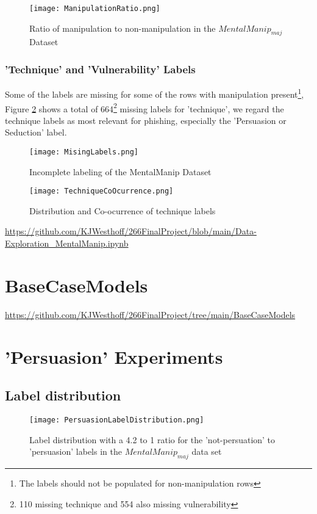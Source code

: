\documentclass[
	letterpaper, %
	12pt, %
	unnumberedsections, %
	twoside, %
]{LTJournalArticle}
\begin{document}
\begin{appendices}
	\begin{figure}[!htp] %
		\centering
		\texttt{[image: ManipulationRatio.png]}
		\caption{Ratio of manipulation to non-manipulation in the $MentalManip_{maj}$ Dataset}
		\label{fig:ManipulationRatio}
	\end{figure}

	\subsubsection{'Technique' and 'Vulnerability' Labels}
	Some of the labels are missing for some of the rows with manipulation present\footnote{The labels should not be populated for non-manipulation rows}, Figure \ref{fig:MissingLabels} shows a total of 664\footnote{110 missing technique and 554 also missing vulnerability} missing labels for 'technique', we regard the technique labels as most relevant for phishing, especially the 'Persuasion or Seduction' label.
	\begin{figure}[!htp] %
		\centering
		\texttt{[image: MisingLabels.png]}
		\caption{Incomplete labeling of the MentalManip Dataset}
		\label{fig:MissingLabels}
	\end{figure}


	\begin{figure}[!htp] %
		\centering
		\texttt{[image: TechniqueCoOcurrence.png]}
		\caption{Distribution and Co-ocurrence of technique labels}
		\label{fig:TechCoOcurrence}
	\end{figure}








	\url{https://github.com/KJWesthoff/266FinalProject/blob/main/Data-Exploration_MentalManip.ipynb}

	\section{BaseCaseModels}\label{appendix:BaseCaseModels}
	\url{https://github.com/KJWesthoff/266FinalProject/tree/main/BaseCaseModels}

	\section{'Persuasion' Experiments}\label{appendix:PersuasionExperiments}
	\subsection{Label distribution}\label{appendix:PersuasionLabelDistribution}
	\begin{figure}[!htp] %
		\centering
		\texttt{[image: PersuasionLabelDistribution.png]}
		\caption{Label distribution with a 4.2 to 1 ratio for the 'not-persuation' to  'persuasion' labels in the $MentalManip_{maj}$ data set}
		\label{fig:PersuasionLabelDistribution}
	\end{figure}



\end{appendices}
\end{document}
